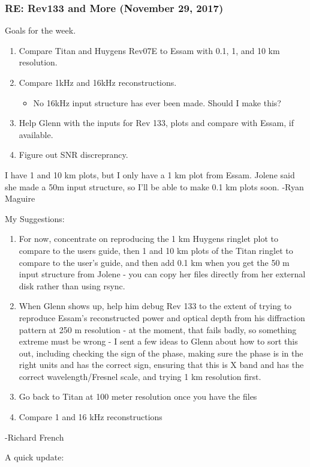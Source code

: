 \documentclass[crop=false,class=article,oneside]{standalone}
\begin{document}
\subsubsection{\footnotesize RE: Rev133 and More (November 29, 2017)}
Goals for the week.
\begin{enumerate}
    \item Compare Titan and Huygens Rev07E to Essam with 0.1, 1, and 10 km resolution.
    \item Compare 1kHz and 16kHz reconstructions.
    \begin{itemize}
        \item No 16kHz input structure has ever been made. Should I make this?
    \end{itemize}
    \item Help Glenn with the inputs for Rev 133, plots and compare with Essam, if available.
    \item Figure out SNR discreprancy.
\end{enumerate}
I have 1 and 10 km plots, but I only have a 1 km plot from Essam. Jolene said she made a 50m input structure, so I'll be able to make 0.1 km plots soon. -Ryan Maguire\par
My Suggestions:
\begin{enumerate}
    \item For now, concentrate on reproducing the 1 km Huygens ringlet plot to compare to the users guide, then 1 and 10 km plots of the Titan ringlet to compare to the user's guide, and then add 0.1 km when you get the 50 m input structure from Jolene - you can copy her files directly from her external disk rather than using rsync. 
    \item When Glenn shows up, help him debug Rev 133 to the extent of trying to reproduce Essam's reconstructed power and optical depth from his diffraction pattern at 250 m resolution - at the moment, that fails badly, so something extreme must be wrong - I sent a few ideas to Glenn about how to sort this out, including checking the sign of the phase, making sure the phase is in the right units and has the correct sign, ensuring that this is X band and has the correct wavelength/Fresnel scale, and trying 1 km resolution first. 
    \item Go back to Titan at 100 meter resolution once you have the files
    \item Compare 1 and 16 kHz reconstructions
\end{enumerate}
-Richard French\par
A quick update:
\end{document}
